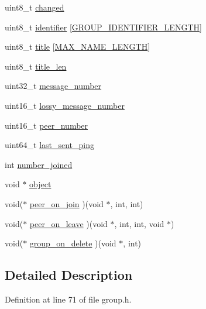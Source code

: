 \begin{DoxyCompactItemize}
\begin{tabbing}
\end{tabbing}\item 
uint8\+\_\+t \hyperlink{struct_group__c_aab3e81d63c7e7e9e693aa0f5fb574fa4}{changed}
\item 
uint8\+\_\+t \hyperlink{struct_group__c_a590984b7f44686ea4892ffa2651b0cda}{identifier} \mbox{[}\hyperlink{toxcore_2group_8h_abe67a1388deb599ec26ecae07a1d4e9e}{G\+R\+O\+U\+P\+\_\+\+I\+D\+E\+N\+T\+I\+F\+I\+E\+R\+\_\+\+L\+E\+N\+G\+T\+H}\mbox{]}
\item 
uint8\+\_\+t \hyperlink{struct_group__c_a9ace0499016685340a1f3009a7aa01e0}{title} \mbox{[}\hyperlink{_messenger_8h_a0c397a708cec89c74029582574516b30}{M\+A\+X\+\_\+\+N\+A\+M\+E\+\_\+\+L\+E\+N\+G\+T\+H}\mbox{]}
\item 
uint8\+\_\+t \hyperlink{struct_group__c_ac32d4f2bb9021dfa0b7ce5f9537412d7}{title\+\_\+len}
\item 
uint32\+\_\+t \hyperlink{struct_group__c_a1ecee33a5d6309a114891c3fb740b66c}{message\+\_\+number}
\item 
uint16\+\_\+t \hyperlink{struct_group__c_acc475ae1ff50d43f08a2cc920a5d2ae5}{lossy\+\_\+message\+\_\+number}
\item 
uint16\+\_\+t \hyperlink{struct_group__c_a264348ec1f724e05464ca97b7c432817}{peer\+\_\+number}
\item 
uint64\+\_\+t \hyperlink{struct_group__c_a0137c615a93acf73b05a3d710231dd3d}{last\+\_\+sent\+\_\+ping}
\item 
int \hyperlink{struct_group__c_a50fa99a57ee7c9280fc90b7c33d760d0}{number\+\_\+joined}
\item 
void $\ast$ \hyperlink{struct_group__c_a077376d12464f945e2414d5499c79b3f}{object}
\item 
void($\ast$ \hyperlink{struct_group__c_a218cd2e97bdb682b90f72faa6eb08576}{peer\+\_\+on\+\_\+join} )(void $\ast$, int, int)
\item 
void($\ast$ \hyperlink{struct_group__c_a7a79b984292a5ea1f68aca7b73067370}{peer\+\_\+on\+\_\+leave} )(void $\ast$, int, int, void $\ast$)
\item 
void($\ast$ \hyperlink{struct_group__c_a43df326d671eb30dd294d5d71d3cd09c}{group\+\_\+on\+\_\+delete} )(void $\ast$, int)
\end{DoxyCompactItemize}


\subsection{Detailed Description}


Definition at line 71 of file group.\+h.



